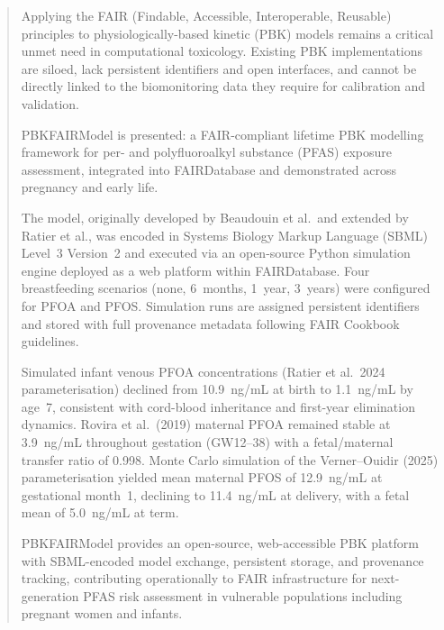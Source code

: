 \documentclass[preprint,12pt]{elsarticle}
\begin{document}
\begin{linenumbers}
\begin{abstract} %

Applying the FAIR (Findable, Accessible, Interoperable, Reusable)
principles to physiologically-based kinetic (PBK) models remains a
critical unmet need in computational toxicology. Existing PBK
implementations are siloed, lack persistent identifiers and open
interfaces, and cannot be directly linked to the biomonitoring data they
require for calibration and validation.

PBKFAIRModel is presented: a FAIR-compliant lifetime PBK modelling
framework for per- and polyfluoroalkyl substance (PFAS) exposure
assessment, integrated into FAIRDatabase and demonstrated across
pregnancy and early life.

The model, originally developed by Beaudouin et al.\ and extended by
Ratier et al., was encoded in Systems Biology Markup Language (SBML)
Level~3 Version~2 and executed via an open-source Python simulation engine
deployed as a web platform within FAIRDatabase. Four breastfeeding
scenarios (none, 6~months, 1~year, 3~years) were configured for PFOA
and PFOS. Simulation runs are assigned persistent identifiers and stored
with full provenance metadata following FAIR Cookbook guidelines.

Simulated infant venous PFOA concentrations (Ratier et al.\ 2024 parameterisation)
declined from 10.9~ng/mL at birth to 1.1~ng/mL by age~7, consistent with
cord-blood inheritance and first-year elimination dynamics.
Rovira et al.\ (2019) maternal PFOA remained stable at 3.9~ng/mL throughout
gestation (GW12--38) with a fetal/maternal transfer ratio of 0.998.
Monte Carlo simulation of the Verner--Ouidir (2025) parameterisation
yielded mean maternal PFOS of 12.9~ng/mL at gestational month~1,
declining to 11.4~ng/mL at delivery, with a fetal mean of 5.0~ng/mL at term.

PBKFAIRModel provides an open-source, web-accessible PBK platform with
SBML-encoded model exchange, persistent storage, and provenance tracking,
contributing operationally to FAIR infrastructure for next-generation PFAS risk
assessment in vulnerable populations including pregnant women and infants.


\end{abstract}
\end{linenumbers}
\end{document}
